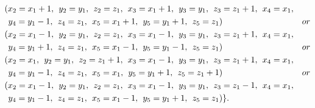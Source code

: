 \begin{align*}
&(x_{2}=x_{1}+1,\hspace{1ex} y_{2}=y_{1},\hspace{1ex} z_{2}=z_{1},\hspace{1ex} x_{3}=x_{1}+1,\hspace{1ex} y_{3}=y_{1},\hspace{1ex} z_{3}=z_{1}+1,\hspace{1ex} x_{4}=x_{1},\\
&\hspace{1ex} y_{4}=y_{1}-1,\hspace{1ex} z_{4}=z_{1},\hspace{1ex} x_{5}=x_{1}+1,\hspace{1ex} y_{5}=y_{1}+1,\hspace{1ex} z_{5}=z_{1})&or\\ 
&(x_{2}=x_{1}-1,\hspace{1ex} y_{2}=y_{1},\hspace{1ex} z_{2}=z_{1},\hspace{1ex} x_{3}=x_{1}-1,\hspace{1ex} y_{3}=y_{1},\hspace{1ex} z_{3}=z_{1}+1,\hspace{1ex} x_{4}=x_{1},\\
&\hspace{1ex} y_{4}=y_{1}+1,\hspace{1ex} z_{4}=z_{1},\hspace{1ex} x_{5}=x_{1}-1,\hspace{1ex} y_{5}=y_{1}-1,\hspace{1ex} z_{5}=z_{1})&or\\ 
&(x_{2}=x_{1},\hspace{1ex} y_{2}=y_{1},\hspace{1ex} z_{2}=z_{1}+1,\hspace{1ex} x_{3}=x_{1}-1,\hspace{1ex} y_{3}=y_{1},\hspace{1ex} z_{3}=z_{1}+1,\hspace{1ex} x_{4}=x_{1},\\
&\hspace{1ex} y_{4}=y_{1}-1,\hspace{1ex} z_{4}=z_{1},\hspace{1ex} x_{5}=x_{1},\hspace{1ex} y_{5}=y_{1}+1,\hspace{1ex} z_{5}=z_{1}+1)&or\\ 
&(x_{2}=x_{1}-1,\hspace{1ex} y_{2}=y_{1},\hspace{1ex} z_{2}=z_{1},\hspace{1ex} x_{3}=x_{1}-1,\hspace{1ex} y_{3}=y_{1},\hspace{1ex} z_{3}=z_{1}-1,\hspace{1ex} x_{4}=x_{1},\\
&\hspace{1ex} y_{4}=y_{1}-1,\hspace{1ex} z_{4}=z_{1},\hspace{1ex} x_{5}=x_{1}-1,\hspace{1ex} y_{5}=y_{1}+1,\hspace{1ex} z_{5}=z_{1})\}.
\end{align*}
